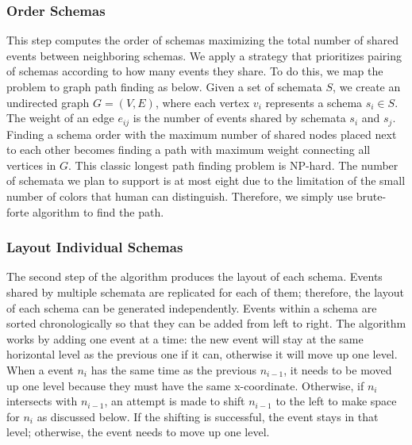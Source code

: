\subsubsection{Order Schemas}
\label{sub:layout-order}
This step computes the order of schemas maximizing the total number of shared events between neighboring schemas.
We apply a strategy that prioritizes pairing of schemas according to how many events they share. To do this, we map the problem to graph path finding as below. Given a set of schemata $S$, we create an undirected graph $G = (V,E)$, where each vertex $v_i$ represents a schema $s_i \in S$. The weight of an edge $e_{ij}$ is the number of events shared by schemata $s_i$ and $s_j$. Finding a schema order with the maximum number of shared nodes placed next to each other becomes finding a path with maximum weight connecting all vertices in $G$. This classic longest path finding problem is NP-hard. The number of schemata we plan to support is at most eight due to the limitation of the small number of colors that human can distinguish. Therefore, we simply use brute-forte algorithm to find the path.

\subsubsection{Layout Individual Schemas}
\label{sub:layout-schema}
The second step of the algorithm produces the layout of each schema. Events shared by multiple schemata are replicated for each of them; therefore, the layout of each schema can be generated independently. Events within a schema are sorted chronologically so that they can be added from left to right. The algorithm works by adding one event at a time: the new event will stay at the same horizontal level as the previous one if it can, otherwise it will move up one level. When a event $n_i$ has the same time as the previous $n_{i-1}$, it needs to be moved up one level because they must have the same x-coordinate. Otherwise, if $n_i$ intersects with $n_{i-1}$, an attempt is made to shift $n_{i-1}$ to the left to make space for $n_i$ as discussed below. If the shifting is successful, the event stays in that level; otherwise, the event needs to move up one level.

